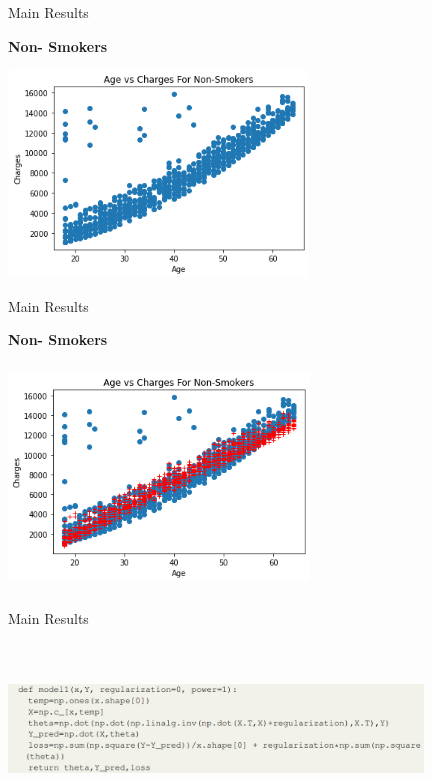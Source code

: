 \documentclass[handout,9pt]{beamer}
\numberwithin{theorem}{section}
\begin{document}
\begin{frame}{Main Results}
	\begin{spacing}{1}
		\textbf{Non- Smokers}
		\begin{center}
			\includegraphics[height=5.5cm, width=8cm]{work19}
		\end{center}
	\hspace{3.5cm}{Correlation between Age and Charges = 0.92874}
	\end{spacing}
\end{frame}

\begin{frame}{Main Results}
	\begin{spacing}{1}
		\textbf{Non- Smokers}
		\begin{center}
			\includegraphics[height=6cm, width=8cm]{work21}
		\end{center}
	\end{spacing}
\end{frame}

\begin{frame}{Main Results}
	\begin{spacing}{1}
		\begin{center}
			\includegraphics[height=4.5cm, width=11cm]{model}
		\end{center}
	\end{spacing}
\end{frame}
\end{document}
